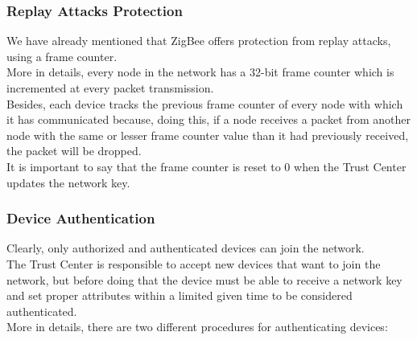 \documentclass[12pt]{report}
\begin{document}
\subsubsection{Replay Attacks Protection}
\bigskip
We have already mentioned that ZigBee offers protection from replay attacks, using a frame counter.\\
More in details, every node in the network has a 32-bit frame counter which is incremented at every packet transmission.\\
Besides, each device tracks the previous frame counter of every node with which it has communicated because, doing this, if a node receives a packet from another node with the same or lesser frame counter value than it had previously received, the packet will be dropped.\\
It is important to say that the frame counter is reset to 0 when the Trust Center updates the network key.

\subsubsection{Device Authentication}
\bigskip
Clearly, only authorized and authenticated devices can join the network.\\
The Trust Center is responsible to accept new devices that want to join the network, but before doing that the device must be able to receive a network key and set proper attributes within a limited given time to be considered authenticated.\\
More in details, there are two different procedures for authenticating devices:
\end{document}
